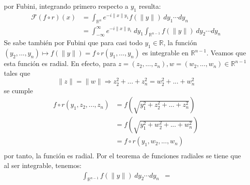 \documentclass[12pt]{report}
\theoremstyle{largebreak}
\newcommand\norm[1]{\ensuremath{\|#1\|}}
\newcommand{\fou}[1]{\ensuremath{\mathcal{F}#1}}
\begin{document}
\begin{sol}
        por Fubini, integrando primero respecto a $y_1$ resulta:
        \begin{equation*}
            \begin{split}
                \fou{(f\circ r)}(x)&=\int_{\mathbb{R}^n}e^{ -i\norm{x}y_1}f(\norm{y})\:dy_1\cdots dy_n\\
                &=\int_{-\infty}^\infty e^{ -i\norm{x}y_1}\:dy_1 \int_{\mathbb{R}^{ n-1}}f(\norm{y})\:dy_2\cdots dy_n
            \end{split}
        \end{equation*}
        Se sabe también por Fubini que para casi todo $y_1\in\mathbb{R}$, la función $(y_2,...,y_n)\mapsto f(\norm{y})=f\circ r(y_1,...,y_n)$ es integrable en $\mathbb{R}^{ n-1}$. Veamos que esta función es radial. En efecto, para $z=(z_2,...,z_n),w=(w_2,...,w_n)\in\mathbb{R}^{ n-1}$ tales que
        \begin{equation*}
            \norm{z}=\norm{w}\Rightarrow z_2^2+...+z_n^2=w_2^2+...+w_n^2
        \end{equation*}
        se cumple
        \begin{equation*}
            \begin{split}
                f\circ r(y_1,z_2,...,z_n)&=f(\sqrt{y_1^2+z_2^2+...+z_n^2})\\
                &=f(\sqrt{y_1^2+w_2^2+...+w_n^2})\\
                &=f\circ r(y_1,w_2,...,w_n)\\
            \end{split}
        \end{equation*}
        por tanto, la función es radial. Por el teorema de funciones radiales se tiene que al ser integrable, tenemos:
        \begin{equation*}
            \begin{split}
                \int_{\mathbb{R}^{ n-1}}f(\norm{y})\:dy_2\cdots dy_n&=
            \end{split}
        \end{equation*}
    \end{sol}
\end{document}
